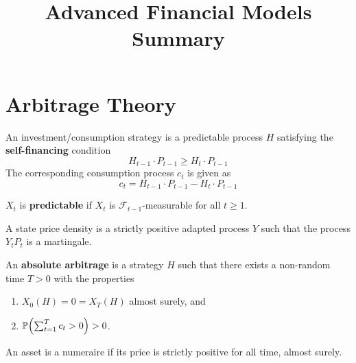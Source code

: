 

\title{Advanced Financial Models Summary}



\maketitle

\section{Arbitrage Theory}
\label{sec:arbitrage-theory}

\begin{defn}
  \label{sec:arbitrage-theory-1}
  An investment/consumption strategy is a predictable process $H$
  satisfying the \textbf{self-financing} condition
  \begin{equation}
    \label{eq:1}
    H_{t-1} \cdot P_{t-1} \geq H_{t} \cdot P_{t-1}
  \end{equation}
  The corresponding consumption process $c_{t}$ is given as
  \begin{equation}
    \label{eq:2}
    c_{t} = H_{t-1} \cdot P_{t-1} - H_{t} \cdot P_{t-1}
  \end{equation}
\end{defn}

\begin{defn}
  \label{sec:arbitrage-theory-2}
  $X_{t}$ is \textbf{predictable} if $X_{t}$ is
  $\mathcal{F}_{t-1}$-measurable for all $t \geq 1$.
\end{defn}

\begin{defn}
  \label{sec:arbitrage-theory-3}
  A state price density is a strictly positive adapted process $Y$
  such that the process $Y_{t} P_{t}$ is a martingale.
\end{defn}

\begin{defn}
  \label{sec:arbitrage-theory-4}
  An \textbf{absolute arbitrage} is a strategy $H$ such that there
  exists a non-random time $T > 0$ with the properties
  \begin{enumerate}
  \item $X_{0}(H) = 0 = X_{T}(H)$ almost surely, and
  \item $\Prob{\sum_{t=1}^{T} c_{t} > 0} > 0$.
  \end{enumerate}
\end{defn}

\begin{defn}
  \label{sec:arbitrage-theory-5}
  An asset is a \textnormal{numeraire} if its price is strictly
  positive for all time, almost surely.
\end{defn}

